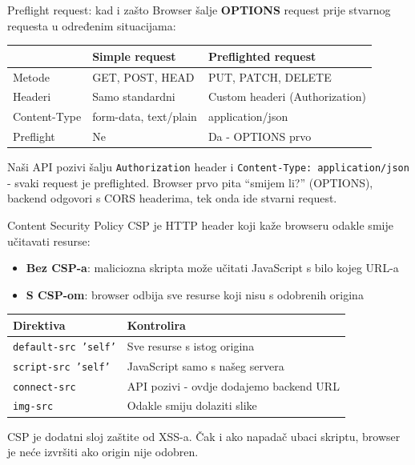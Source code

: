 \begin{frame}{Preflight request: kad i zašto}
Browser šalje \textbf{OPTIONS} request prije stvarnog requesta u određenim situacijama:

\vspace{0.4em}
\begin{tabular}{@{}lp{4cm}p{5cm}@{}}
  \toprule
  & \textbf{Simple request} & \textbf{Preflighted request} \\
  \midrule
  Metode & GET, POST, HEAD & PUT, PATCH, DELETE \\
  Headeri & Samo standardni & Custom headeri (Authorization) \\
  Content-Type & form-data, text/plain & application/json \\
  Preflight & Ne & Da - OPTIONS prvo \\
  \bottomrule
\end{tabular}

\vspace{0.6em}
Naši API pozivi šalju \texttt{Authorization} header i \texttt{Content-Type: application/json} - svaki request je preflighted. Browser prvo pita \enquote{smijem li?} (OPTIONS), backend odgovori s CORS headerima, tek onda ide stvarni request.
\end{frame}

\begin{frame}{Content Security Policy}
CSP je HTTP header koji kaže browseru odakle smije učitavati resurse:

\vspace{0.4em}
\begin{itemize}
  \item \textbf{Bez CSP-a}: maliciozna skripta može učitati JavaScript s bilo kojeg URL-a
  \item \textbf{S CSP-om}: browser odbija sve resurse koji nisu s odobrenih origina
\end{itemize}

\vspace{0.6em}
\begin{tabular}{@{}lp{8cm}@{}}
  \toprule
  \textbf{Direktiva} & \textbf{Kontrolira} \\
  \midrule
  \texttt{default-src 'self'} & Sve resurse s istog origina \\
  \texttt{script-src 'self'} & JavaScript samo s našeg servera \\
  \texttt{connect-src} & API pozivi - ovdje dodajemo backend URL \\
  \texttt{img-src} & Odakle smiju dolaziti slike \\
  \bottomrule
\end{tabular}

\vspace{0.4em}
CSP je dodatni sloj zaštite od XSS-a. Čak i ako napadač ubaci skriptu, browser je neće izvršiti ako origin nije odobren.
\end{frame}

